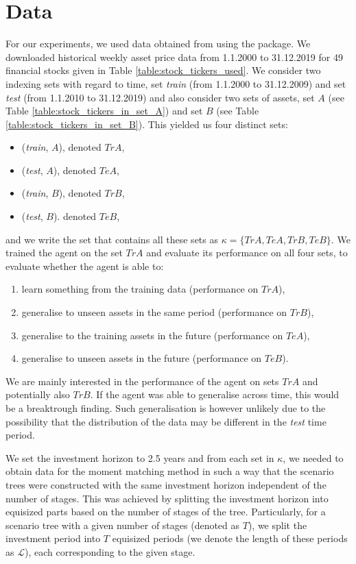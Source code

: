 \section{Data}
\label{section:data}
For our experiments, we used data obtained from \cite{yahoo} using the \cite[version 0.1.74]{yfinance} package. We downloaded historical weekly asset price data from 1.1.2000 to 31.12.2019 for 49 financial stocks given in Table \ref{table:stock_tickers_used}. We consider two indexing sets with regard to time, set \textit{train} (from 1.1.2000 to 31.12.2009) and set \textit{test} (from 1.1.2010 to 31.12.2019) and also consider two sets of assets, set $A$ (see Table \ref{table:stock_tickers_in_set_A}) and set $B$ (see Table \ref{table:stock_tickers_in_set_B}). This yielded us four distinct sets:
\begin{itemize}
\item (\textit{train}, $A$), denoted $TrA$,
\item (\textit{test}, $A$), denoted $TeA$,
\item (\textit{train}, $B$), denoted $TrB$,
\item (\textit{test}, $B$). denoted $TeB$,
\end{itemize}
and we write the set that contains all these sets as $\kappa=\{TrA, TeA, TrB, TeB\}$.
We trained the agent on the set $TrA$ and evaluate its performance on all four sets, to evaluate whether the agent is able to:
\begin{enumerate}
\item learn something from the training data (performance on $TrA$),
\item generalise to unseen assets in the same period (performance on $TrB$),
\item generalise to the training assets in the future (performance on $TeA$),
\item generalise to unseen assets in the future (performance on $TeB$).
\end{enumerate}

\begin{rem}
We are mainly interested in the performance of the agent on sets $TrA$ and potentially also $TrB$. If the agent was able to generalise across time, this would be a breaktrough finding. Such generalisation is however unlikely due to the possibility that the distribution of the data may be different in the \textit{test} time period.
\end{rem}

We set the investment horizon to 2.5 years and from each set in $\kappa$, we needed to obtain data for the moment matching method in such a way that the scenario trees were constructed with the same investment horizon independent of the number of stages. This was achieved by splitting the investment horizon into equisized parts based on the number of stages of the tree.
Particularly, for a scenario tree with a given number of stages (denoted as $T$), we split the investment period into $T$ equisized periods (we denote the length of these periods as $\mathcal{L}$), each corresponding to the given stage.

